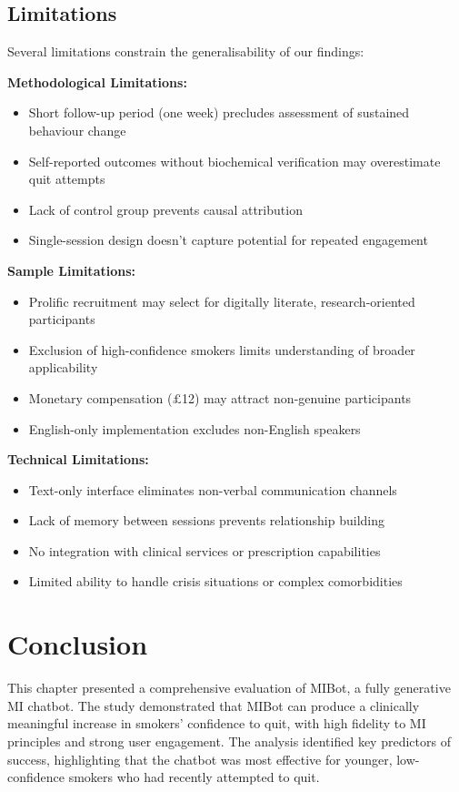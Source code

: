 \subsection{Limitations}

Several limitations constrain the generalisability of our findings:

\textbf{Methodological Limitations:}
\begin{itemize}
\item Short follow-up period (one week) precludes assessment of sustained behaviour change
\item Self-reported outcomes without biochemical verification may overestimate quit attempts
\item Lack of control group prevents causal attribution
\item Single-session design doesn't capture potential for repeated engagement
\end{itemize}

\textbf{Sample Limitations:}
\begin{itemize}
\item Prolific recruitment may select for digitally literate, research-oriented participants
\item Exclusion of high-confidence smokers limits understanding of broader applicability
\item Monetary compensation ($\pounds$12) may attract non-genuine participants
\item English-only implementation excludes non-English speakers
\end{itemize}

\textbf{Technical Limitations:}
\begin{itemize}
\item Text-only interface eliminates non-verbal communication channels
\item Lack of memory between sessions prevents relationship building
\item No integration with clinical services or prescription capabilities
\item Limited ability to handle crisis situations or complex comorbidities
\end{itemize}

\section{Conclusion}
\label{sec:conclusion}

This chapter presented a comprehensive evaluation of MIBot, a fully generative MI chatbot. The study demonstrated that MIBot can produce a clinically meaningful increase in smokers' confidence to quit, with high fidelity to MI principles and strong user engagement. The analysis identified key predictors of success, highlighting that the chatbot was most effective for younger, low-confidence smokers who had recently attempted to quit.

